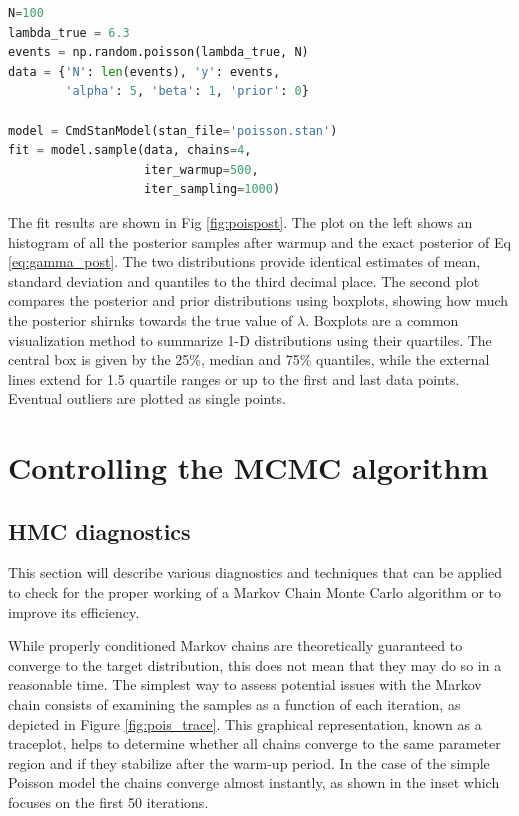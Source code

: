 \begin{lstlisting}[language=Python]
N=100
lambda_true = 6.3
events = np.random.poisson(lambda_true, N)
data = {'N': len(events), 'y': events,
        'alpha': 5, 'beta': 1, 'prior': 0}

model = CmdStanModel(stan_file='poisson.stan')
fit = model.sample(data, chains=4,
                   iter_warmup=500,
                   iter_sampling=1000)
\end{lstlisting}



The fit results are shown in Fig \ref{fig:poispost}. The plot on the left shows an histogram of all the posterior
samples
after warmup and the exact posterior of Eq \ref{eq:gamma_post}. The two distributions provide identical estimates of mean,
standard deviation and quantiles to the third decimal place. The second plot compares the posterior and prior
distributions using boxplots, showing how much the posterior shirnks towards the true value of $\lambda$. Boxplots are a common visualization method to summarize 1-D distributions using their quartiles. The central box is given by the 25\%, median and 75\% quantiles, while the external lines extend for 1.5 quartile ranges or up to the first and last data points. Eventual outliers are plotted as single points. 

\section{Controlling the MCMC algorithm}

\subsection{HMC diagnostics}
This section will describe various diagnostics and techniques that can be applied to check for the proper working of a
Markov Chain Monte Carlo algorithm or to improve its efficiency.

While properly conditioned Markov chains are theoretically guaranteed to converge to the target distribution, this does not mean that they may do so in a reasonable time. 
The simplest way to assess potential issues with the Markov chain consists of examining the samples as a function of
each iteration, as depicted in Figure \ref{fig:pois_trace}. This graphical representation, known as a traceplot, helps
to determine whether all chains converge to the same parameter region and if they stabilize after the warm-up period.
In the case of the simple Poisson model the chains converge almost instantly, as shown in the inset which focuses on the first 50 iterations.

